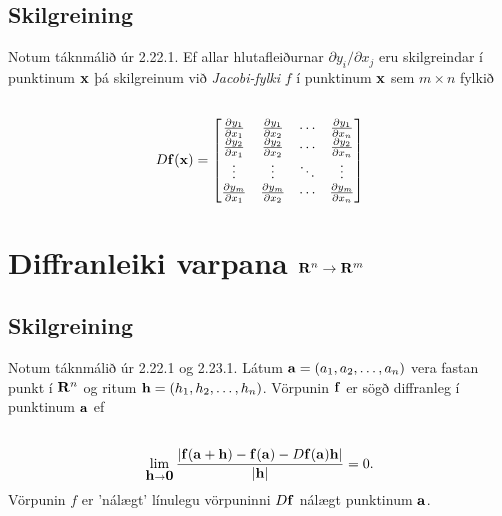 \documentclass[a4paper,10pt,icelandic]{sphinxmanual}
\begin{document}
\subsection{Skilgreining}
\label{Kafli2:index-19}\label{Kafli2:id36}
Notum táknmálið úr 2.22.1. Ef allar hlutafleiðurnar \(\partial
y_i/\partial x_j\) eru skilgreindar í punktinum \(\mbox{${\bf x}$}\)
þá skilgreinum við \emph{Jacobi-fylki} \(f\) í punktinum
\(\mbox{${\bf x}$}\) sem \(m\times n\) fylkið
\begin{gather}
\begin{split}\displaystyle\end{split}\notag\\\begin{split}D\mbox{${\bf f}$}(\mbox{${\bf x}$})=\begin{bmatrix}
\frac{\partial y_1}{\partial x_1}&\frac{\partial y_1}{\partial x_2}&
\cdots&\frac{\partial y_1}{\partial x_n}\\
\frac{\partial y_2}{\partial x_1}&\frac{\partial y_2}{\partial x_2}&
\cdots&\frac{\partial y_2}{\partial x_n}\\
\vdots&\vdots&\ddots&\vdots\\
\frac{\partial y_m}{\partial x_1}&\frac{\partial y_m}{\partial x_2}&
\cdots&\frac{\partial y_m}{\partial x_n}
\end{bmatrix}\end{split}\notag
\end{gather}

\section{Diffranleiki varpana \(\mbox{${\bf R}^n$}\rightarrow\mbox{${\bf R}^m$}\)}
\label{Kafli2:diffranleiki-varpana}\label{Kafli2:index-20}

\subsection{Skilgreining}
\label{Kafli2:id37}
Notum táknmálið úr 2.22.1 og 2.23.1. Látum
\(\mbox{${\bf a}$}=(a_1, a_2, \ldots, a_n)\) vera fastan punkt í
\(\mbox{${\bf R}^n$}\) og ritum
\(\mbox{${\bf h}$}=(h_1,h_2,\ldots,h_n)\). Vörpunin
\(\mbox{${\bf f}$}\) er sögð diffranleg í punktinum
\(\mbox{${\bf a}$}\) ef
\begin{gather}
\begin{split}\displaystyle\end{split}\notag\\\begin{split}\lim_{\mbox{${\bf h}$}\rightarrow
  \mbox{${\bf 0}$}}\frac{|\mbox{${\bf f}$}(\mbox{${\bf a}$}+\mbox{${\bf h}$})-\mbox{${\bf f}$}(\mbox{${\bf a}$})-D\mbox{${\bf f}$}(\mbox{${\bf a}$})\mbox{${\bf h}$}|}{|\mbox{${\bf h}$}|}=0.\end{split}\notag
\end{gather}
Vörpunin \(f\) er ’nálægt’ línulegu vörpuninni
\(D\mbox{${\bf f}$}\) nálægt punktinum \(\mbox{${\bf a}$}\).
\end{document}
